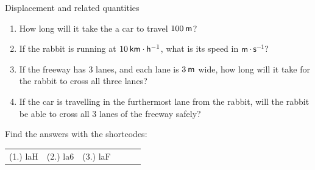 \begin{exercises}{Displacement and related quantities }
\begin{enumerate}[noitemsep, label=\textbf{\arabic*}. ]
\begin{enumerate}[noitemsep, label=\textbf{\alph*}. ]
\label{m38791*uid53}\item How long will it take the a car to travel $100\phantom{\rule{2pt}{0ex}}\mathsf{m}$?
\label{m38791*uid54}\item If the rabbit is running at $10\phantom{\rule{2pt}{0ex}}\mathsf{km}\ensuremath{\cdot}\mathsf{h}{}^{-1}$, what is its speed in $\mathsf{m}\ensuremath{\cdot}\mathsf{s}{}^{-1}$?
\label{m38791*uid55}\item If the freeway has 3 lanes, and each lane is $3\phantom{\rule{2pt}{0ex}}\mathsf{m}$ wide, how long will it take for the rabbit to cross all three lanes?
\label{m38791*uid56}\item If the car is travelling in the furthermost lane from the rabbit, will the rabbit be able to cross all 3 lanes of the freeway safely?
\end{enumerate}
                \end{enumerate}
\label{m38791*secfhsst!!!underscore!!!id1289}
\par {} Find the answers with the shortcodes:
 \par \begin{tabular}[h]{cccccc}
 (1.) laH  &  (2.) la6  &  (3.) laF  & \end{tabular}
\end{exercises}
